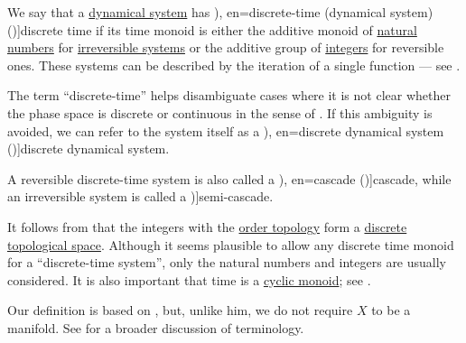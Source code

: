 \begin{definition}\label{def:discrete_dynamical_system}\mimprovised
  We say that a \hyperref[def:dynamical_system]{dynamical system} has \term[ru=(динамическая система с) дискретным временем (\cite[10]{Юмагулов2015ДинамическиеСистемы}), en=discrete-time (dynamical system) (\cite[1]{Rozikov2012MultiDimensionalTimeDynamicalSystem})]{discrete time} if its time monoid is either the additive monoid of \hyperref[def:natural_numbers]{natural numbers} for \hyperref[def:reversible_dynamical_system]{irreversible systems} or the additive group of \hyperref[def:integers]{integers} for reversible ones. These systems can be described by the iteration of a single function --- see .

  The term \enquote{discrete-time} helps disambiguate cases where it is not clear whether the phase space is discrete or continuous in the sense of . If this ambiguity is avoided, we can refer to the system itself as a \term[ru=дискретная динамическая система (\cite[10]{Юмагулов2015ДинамическиеСистемы}), en=discrete dynamical system (\cite[363]{Rozikov2012MultiDimensionalTimeDynamicalSystem})]{discrete dynamical system}.

  A reversible discrete-time system is also called a \term[ru=каскада (\cite[10]{Юмагулов2015ДинамическиеСистемы}), en=cascade (\cite[363]{Rozikov2012MultiDimensionalTimeDynamicalSystem})]{cascade}, while an irreversible system is called a \term[en=semi-cascade (\cite[363]{Rozikov2012MultiDimensionalTimeDynamicalSystem})]{semi-cascade}.
\end{definition}
\begin{comments}
  \item It follows from  that the integers with the \hyperref[def:order_topology]{order topology} form a \hyperref[def:discrete_topology]{discrete topological space}. Although it seems plausible to allow any discrete time monoid for a \enquote{discrete-time system}, only the natural numbers and integers are usually considered. It is also important that time is a \hyperref[def:cyclic_monoid]{cyclic monoid}; see .

  \item Our definition is based on , but, unlike him, we do not require \( X \) to be a manifold. See  for a broader discussion of terminology.
\end{comments}

